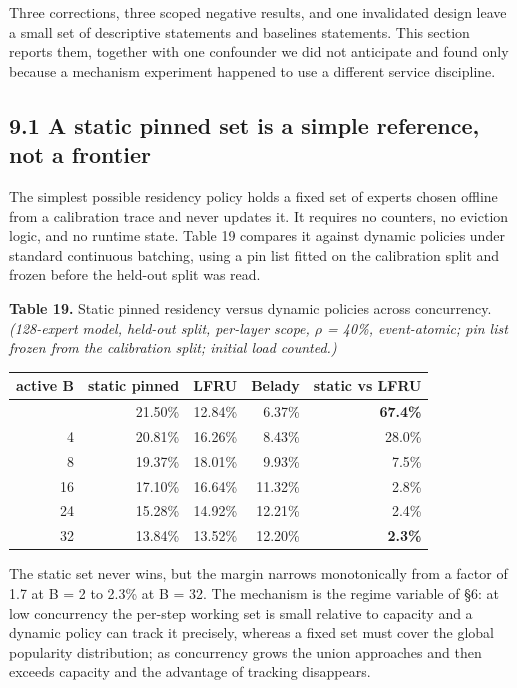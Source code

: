 \documentclass[
  10pt,
  letterpaper,
  10pt]{article}
\newcounter{none} %
\begin{document}
Three corrections, three scoped negative results, and one invalidated
design leave a small set of descriptive statements and baselines
statements. This section reports them, together with one confounder we
did not anticipate and found only because a mechanism experiment
happened to use a different service discipline.

\subsection{9.1 A static pinned set is a simple reference, not a
frontier}\label{a-static-pinned-set-is-a-simple-reference-not-a-frontier}

The simplest possible residency policy holds a fixed set of experts
chosen offline from a calibration trace and never updates it. It
requires no counters, no eviction logic, and no runtime state. Table 19
compares it against dynamic policies under standard continuous batching,
using a pin list fitted on the calibration split and frozen before the
held-out split was read.

\textbf{Table 19.} Static pinned residency versus dynamic policies
across concurrency. \emph{(128-expert model, held-out split, per-layer
scope, \ensuremath{\rho} = 40\%, event-atomic; pin list frozen from the
calibration split; initial load counted.)}

{\def\LTcaptype{none} %
\begin{longtable}[]{@{}rrrrr@{}}
\toprule\noalign{}
active B & static pinned & LFRU & Belady & static vs LFRU \\
\midrule\noalign{}
\endhead
\bottomrule\noalign{}
\endlastfoot
2 & 21.50\% & 12.84\% & 6.37\% & \textbf{\textminus{}67.4\%} \\
4 & 20.81\% & 16.26\% & 8.43\% & \textminus{}28.0\% \\
8 & 19.37\% & 18.01\% & 9.93\% & \textminus{}7.5\% \\
16 & 17.10\% & 16.64\% & 11.32\% & \textminus{}2.8\% \\
24 & 15.28\% & 14.92\% & 12.21\% & \textminus{}2.4\% \\
32 & 13.84\% & 13.52\% & 12.20\% & \textbf{\textminus{}2.3\%} \\
\end{longtable}
}

The static set never wins, but the margin narrows monotonically from a
factor of 1.7 at B = 2 to 2.3\% at B = 32. The mechanism is the regime
variable of §6: at low concurrency the per-step working set is small
relative to capacity and a dynamic policy can track it precisely,
whereas a fixed set must cover the global popularity distribution; as
concurrency grows the union approaches and then exceeds capacity and the
advantage of tracking disappears.
\end{document}
